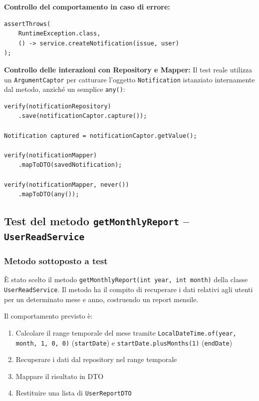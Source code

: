 \documentclass[a4paper,12pt]{article}
\begin{document}
\textbf{Controllo del comportamento in caso di errore:}
\begin{lstlisting}
assertThrows(
    RuntimeException.class,
    () -> service.createNotification(issue, user)
);
\end{lstlisting}

\textbf{Controllo delle interazioni con Repository e Mapper:}
Il test reale utilizza un \texttt{ArgumentCaptor} per catturare l'oggetto \texttt{Notification} istanziato internamente dal metodo, anziché un semplice \texttt{any()}:
\begin{lstlisting}
verify(notificationRepository)
    .save(notificationCaptor.capture());

Notification captured = notificationCaptor.getValue();

verify(notificationMapper)
    .mapToDTO(savedNotification);

verify(notificationMapper, never())
    .mapToDTO(any());
\end{lstlisting}


\subsection{Test del metodo \texttt{getMonthlyReport} -- \texttt{UserReadService}}
\label{sec:testGetMonthlyReportDoc}

\subsubsection{Metodo sottoposto a test}
È stato scelto il metodo \texttt{getMonthlyReport(int year, int month)} della classe \texttt{UserReadService}. Il metodo ha il compito di recuperare i dati relativi agli utenti per un determinato mese e anno, costruendo un report mensile.

Il comportamento previsto è:
\begin{enumerate}
    \item Calcolare il range temporale del mese tramite \texttt{LocalDateTime.of(year, month, 1, 0, 0)} (\texttt{startDate}) e \texttt{startDate.plusMonths(1)} (\texttt{endDate})
    \item Recuperare i dati dal repository nel range temporale
    \item Mappare il risultato in DTO
    \item Restituire una lista di \texttt{UserReportDTO}
\end{enumerate}
\end{document}
